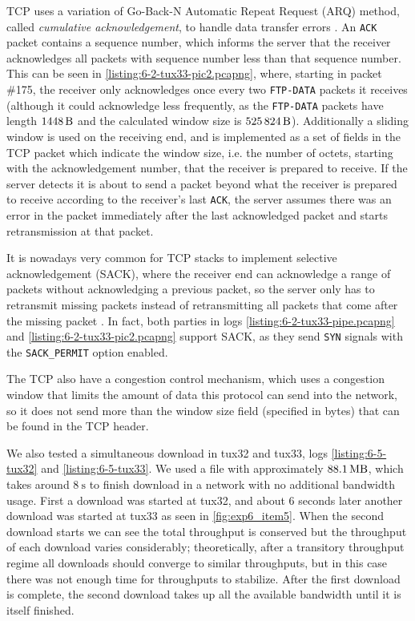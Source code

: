 \documentclass[a4paper, 11pt]{report}
\begin{document}
TCP uses a variation of Go-Back-N Automatic Repeat Request (ARQ) method, called \textit{cumulative acknowledgement}, to handle data transfer errors \cite{rfc793}.
An \texttt{ACK} packet contains a sequence number, which informs the server that the receiver acknowledges all packets with sequence number less than that sequence number.
This can be seen in \ref{listing:6-2-tux33-pic2.pcapng}, where, starting in packet \#175, the receiver only acknowledges once every two \texttt{FTP-DATA} packets it receives (although it could acknowledge less frequently, as the \texttt{FTP-DATA} packets have length $\SI{1448}{\byte}$ and the calculated window size is $\SI{525824}{\byte}$).
Additionally a sliding window is used on the receiving end, and is implemented as a set of fields in the TCP packet which indicate the window size, i.e. the number of octets, starting with the acknowledgement number, that the receiver is prepared to receive. If the server detects it is about to send a packet beyond what the receiver is prepared to receive according to the receiver's last \texttt{ACK}, the server assumes there was an error in the packet immediately after the last acknowledged packet and starts retransmission at that packet.

It is nowadays very common for TCP stacks to implement selective acknowledgement (SACK), where the receiver end can acknowledge a range of packets without acknowledging a previous packet, so the server only has to retransmit missing packets instead of retransmitting all packets that come after the missing packet \cite{rfc2018}.
In fact, both parties in logs \ref{listing:6-2-tux33-pipe.pcapng} and \ref{listing:6-2-tux33-pic2.pcapng} support SACK, as they send \texttt{SYN} signals with the \texttt{SACK\_PERMIT} option enabled.

The TCP also have a congestion control mechanism, which uses a congestion window that limits the amount of data this protocol can send into the network, 
so it does not send more than the window size field (specified in bytes) that can be found in the TCP header. 

We also tested a simultaneous download in tux32 and tux33, logs \ref{listing:6-5-tux32} and \ref{listing:6-5-tux33}.
We used a file with approximately $\SI{88.1}{\mega\byte}$, which takes around $\SI{8}{\second}$ to finish download in a network with no additional bandwidth usage.
First a download was started at tux32, and about 6 seconds later another download was started at tux33 as seen in \ref{fig:exp6_item5}.
When the second download starts we can see the total throughput is conserved but the throughput of each download varies considerably; theoretically, after a transitory throughput regime all downloads should converge to similar throughputs, but in this case there was not enough time for throughputs to stabilize.
After the first download is complete, the second download takes up all the available bandwidth until it is itself finished.
\end{document}
